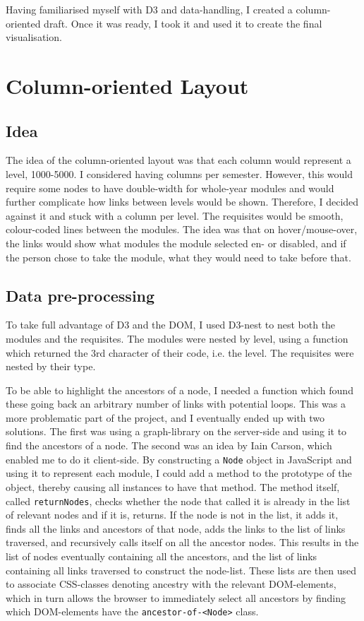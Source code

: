 Having familiarised myself with D3 and data-handling, I created a
column-oriented draft. Once it was ready, I took it and used it to create the
final visualisation.

\section{Column-oriented Layout}
    \subsection{Idea}
    The idea of the column-oriented layout was that each column would represent
    a level, 1000-5000. I considered having columns per semester. However, this
    would require some nodes to have double-width for whole-year modules and
    would further complicate how links between levels would be shown. Therefore,
    I decided against it and stuck with a column per level. The requisites would
    be smooth, colour-coded lines between the modules. The idea was that on
    hover/mouse-over, the links would show what modules the module selected
    en- or disabled, and if the person chose to take the module, what they would
    need to take before that.
    
    \subsection{Data pre-processing}
    To take full advantage of D3 and the DOM, I used D3-nest to nest both the
    modules and the requisites. The modules were nested by level, using a
    function which returned the 3rd character of their code, i.e. the level. The
    requisites were nested by their type.
    
    To be able to highlight the ancestors of a node, I needed a function which
    found these going back an arbitrary number of links with potential loops.
    This was a more problematic part of the project, and I eventually ended up
    with two solutions. The first was using a graph-library on the server-side
    and using it to find the ancestors of a node. The second was an idea by
    Iain Carson, which enabled me to do it client-side. By constructing a
    \texttt{Node} object in JavaScript and using it to represent each module, I
    could add a method to the prototype of the object, thereby causing all
    instances to have that method. The method itself, called
    \texttt{returnNodes}, checks whether the node that called it is already in
    the list of relevant nodes and if it is, returns. If the node is not in the
    list, it adds it, finds all the links and ancestors of that node, adds the
    links to the list of links traversed, and recursively calls itself on all
    the ancestor nodes. This results in the list of nodes eventually containing
    all the ancestors, and the list of links containing all links traversed to
    construct the node-list. These lists are then used to associate CSS-classes
    denoting ancestry with the relevant DOM-elements, which in turn allows the
    browser to immediately select all ancestors by finding which DOM-elements
    have the \texttt{ancestor-of-<Node>} class.
    
